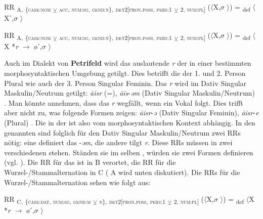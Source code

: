 \ea%
\label{ex:key:163}
 RR \textsubscript{A,} \textsubscript{\{\textsc{case:nom}} \textsubscript{\tiny $\veebar$}\textsubscript{ \textsc{acc}, \textsc{num:sg}, \textsc{gend:n}\},} \textsubscript{\textsc{det2[pron.poss}, \textsc{pers:1}} \textsubscript{\tiny $\veebar$}\textsubscript{ 2, \textsc{num:pl}]} ($\langle$X,$\sigma$ $\rangle$) = \textsubscript{def} $\langle$Xˊ,$\sigma$ $\rangle$
\z

\ea%
\label{ex:key:164}
 RR \textsubscript{A,} \textsubscript{\{\textsc{case:nom}} \textsubscript{\tiny $\veebar$}\textsubscript{ \textsc{acc}, \textsc{num:sg}, \textsc{gend:n}\},} \textsubscript{\textsc{det2[pron.poss}, \textsc{pers:1}} \textsubscript{\tiny $\veebar$}\textsubscript{ 2, \textsc{num:pl}]} ($\langle$X,$\sigma$ $\rangle$) = \textsubscript{def} $\langle$X *\textit{r} $\rightarrow$ øˊ,$\sigma$ $\rangle$
\z

Auch im Dialekt von \textbf{Petrifeld} wird das auslautende \textit{r} der  in einer bestimmten morphosyntaktischen Umgebung getilgt. Dies betrifft die  der 1. und 2. Person Plural wie auch der 3. Person Singular Feminin. Das \textit{r} wird im Dativ Singular Maskulin/Neutrum getilgt: \textit{\=aisr} (=), \textit{\=ais}-\textit{ǝm} (Dativ Singular Maskulin/Neutrum) \citep[65]{Moser1937}. Man könnte annehmen, dass das \textit{r} wegfällt, wenn ein Vokal folgt. Dies trifft aber nicht zu, was folgende Formen zeigen: \textit{\=aisr}-\textit{ǝ} (Dativ Singular Feminin), \textit{\=aisr}-\textit{e} (Plural) \citep[65]{Moser1937}. Die  in der  ist also vom morphosyntaktischen Kontext abhängig. In den genannten  sind folglich für den Dativ Singular Maskulin/Neutrum zwei RRs nötig: eine definiert das  -\textit{ǝm}, die andere tilgt \textit{r}. Diese RRs müssen in zwei verschiedenen  stehen. Ständen sie im selben , würden sie zwei Formen definieren (vgl. ). Die RR für das  ist in  B verortet, die RR für die Wur\-zel-/Stamm\-al\-ter\-na\-tion in  C ( A wird unten diskutiert). Die RRs für die Wur\-zel-/Stamm\-al\-ter\-na\-tion sehen wie folgt aus:

\ea%
\label{ex:key:165}
 RR \textsubscript{C,} \textsubscript{\{\textsc{case:dat}, \textsc{num:sg}, \textsc{gend:m}} \textsubscript{\tiny $\veebar$}\textsubscript{ \textsc{n}\},} \textsubscript{\textsc{det2[pron.poss}, \textsc{pers:1}} \textsubscript{\tiny $\veebar$}\textsubscript{ 2, \textsc{num:pl}]} ($\langle$X,$\sigma$ $\rangle$) = \textsubscript{def} $\langle$X *\textit{r} $\rightarrow$ øˊ,$\sigma$ $\rangle$
\z

